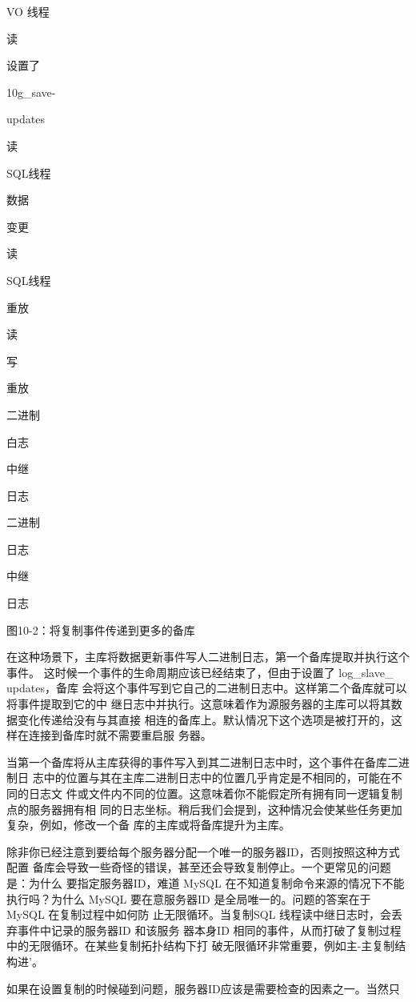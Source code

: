 VO 线程

读

设置了

10g\_save-

updates

读

SQL线程

数据

变更

读

SQL线程

重放

读

写

重放

二进制

白志

中继

日志

二进制

日志

中继

日志

图10-2：将复制事件传递到更多的备库

在这种场景下，主库将数据更新事件写人二进制日志，第一个备库提取并执行这个事件。
这时候一个事件的生命周期应该已经结束了，但由于设置了 log\_slave\_ updates，备库
会将这个事件写到它自己的二进制日志中。这样第二个备库就可以将事件提取到它的中
继日志中并执行。这意味着作为源服务器的主库可以将其数据变化传递给没有与其直接
相连的备库上。默认情况下这个选项是被打开的，这样在连接到备库时就不需要重启服
务器。

当第一个备库将从主库获得的事件写入到其二进制日志中时，这个事件在备库二进制日
志中的位置与其在主库二进制日志中的位置几乎肯定是不相同的，可能在不同的日志文
件或文件内不同的位置。这意味着你不能假定所有拥有同一逻辑复制点的服务器拥有相
同的日志坐标。稍后我们会提到，这种情况会使某些任务更加复杂，例如，修改一个备
库的主库或将备库提升为主库。

除非你已经注意到要给每个服务器分配一个唯一的服务器ID，否则按照这种方式配置
备库会导致一些奇怪的错误，甚至还会导致复制停止。一个更常见的问题是：为什么
要指定服务器ID，难道 MySQL 在不知道复制命令来源的情况下不能执行吗？为什么
MySQL 要在意服务器ID 是全局唯一的。问题的答案在于 MySQL 在复制过程中如何防
止无限循环。当复制SQL 线程读中继日志时，会丢弃事件中记录的服务器ID 和该服务
器本身ID 相同的事件，从而打破了复制过程中的无限循环。在某些复制拓扑结构下打
破无限循环非常重要，例如主-主复制结构进’。

如果在设置复制的时候碰到问题，服务器ID应该是需要检查的因素之一。当然只

